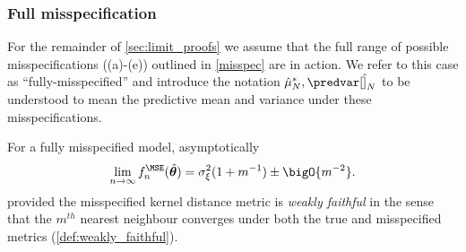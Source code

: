 \subsubsection{Full misspecification}
For the remainder of \ref{sec:limit_proofs} we assume that the full range of possible misspecifications ((a)-(e)) outlined in \autoref{misspec} are in action. We refer to this case as ``fully-misspecified'' and introduce the notation \(\hat{\mu}_N^*,\predvar[\hat]_N\) to be understood to mean the predictive mean and variance under these misspecifications.
\begin{lemma}
    \label{lem:mismatched_mse_limit}
    For a fully misspecified model, asymptotically
    \[\lim_{n\rightarrow\infty}f_n^{\MSE}(\hat{\bm{\theta}}) = \sigma_\xi^2(1+m^{-1}) \pm \bigO{m^{-2}}.\]
    provided the misspecified kernel distance metric is \emph{weakly faithful} in the sense that the \(m^{th}\) nearest neighbour converges under both the true and misspecified metrics (\autoref{def:weakly_faithful}).
\end{lemma}
